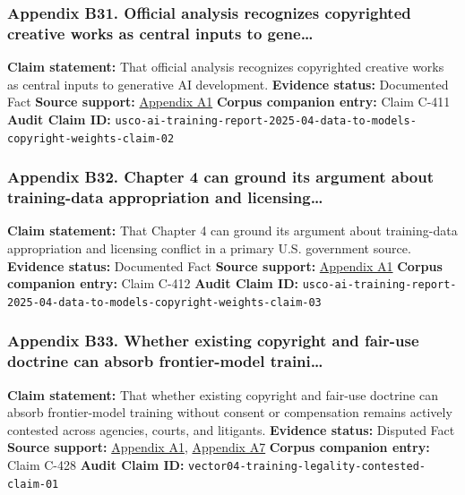 \documentclass[
  american,
  11pt,
  letterpaper,
]{article}
\begin{document}
\subsubsection{Appendix B31. Official analysis recognizes copyrighted
creative works as central inputs to
gene\ldots{}}\label{ch-04-appendix-b31-official-analysis-recognizes-copyrighted-creative-works-as-central-inputs-to-gene}

\textbf{Claim statement:} That official analysis recognizes copyrighted
creative works as central inputs to generative AI development.
\textbf{Evidence status:} Documented Fact \textbf{Source support:}
\hyperref[ch-04-appendix-a1-copyright-and-artificial-intelligence-part-3-generative-ai-training-pre-publication-version]{Appendix
A1} \textbf{Corpus companion entry:} Claim C-411 \textbf{Audit Claim
ID:}
\texttt{usco-ai-training-report-2025-04-data-to-models-copyright-weights-claim-02}

\subsubsection{Appendix B32. Chapter 4 can ground its argument about
training-data appropriation and
licensing\ldots{}}\label{ch-04-appendix-b32-chapter-4-can-ground-its-argument-about-training-data-appropriation-and-licensing}

\textbf{Claim statement:} That Chapter 4 can ground its argument about
training-data appropriation and licensing conflict in a primary U.S.
government source. \textbf{Evidence status:} Documented Fact
\textbf{Source support:}
\hyperref[ch-04-appendix-a1-copyright-and-artificial-intelligence-part-3-generative-ai-training-pre-publication-version]{Appendix
A1} \textbf{Corpus companion entry:} Claim C-412 \textbf{Audit Claim
ID:}
\texttt{usco-ai-training-report-2025-04-data-to-models-copyright-weights-claim-03}

\subsubsection{Appendix B33. Whether existing copyright and fair-use
doctrine can absorb frontier-model
traini\ldots{}}\label{ch-04-appendix-b33-whether-existing-copyright-and-fair-use-doctrine-can-absorb-frontier-model-traini}

\textbf{Claim statement:} That whether existing copyright and fair-use
doctrine can absorb frontier-model training without consent or
compensation remains actively contested across agencies, courts, and
litigants. \textbf{Evidence status:} Disputed Fact \textbf{Source
support:}
\hyperref[ch-04-appendix-a1-copyright-and-artificial-intelligence-part-3-generative-ai-training-pre-publication-version]{Appendix
A1},
\hyperref[ch-04-appendix-a7-bartz-et-al-v-anthropic-pbc-order-on-fair-use]{Appendix
A7} \textbf{Corpus companion entry:} Claim C-428 \textbf{Audit Claim
ID:} \texttt{vector04-training-legality-contested-claim-01}
\end{document}
